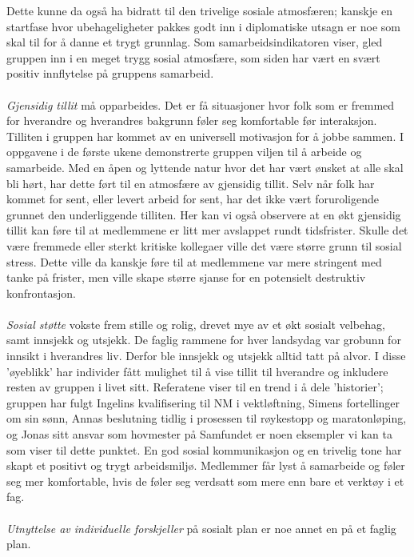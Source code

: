 Dette kunne da også ha bidratt til den trivelige sosiale atmosfæren; kanskje en startfase hvor ubehageligheter pakkes godt inn i diplomatiske utsagn er noe som skal til for å danne et trygt grunnlag.
Som samarbeidsindikatoren viser, gled gruppen inn i en meget trygg sosial atmosfære, som siden har vært en svært positiv innflytelse på gruppens samarbeid.\\
\\
\emph{Gjensidig tillit} må opparbeides. 
Det er få situasjoner hvor folk som er fremmed for hverandre og hverandres bakgrunn føler seg komfortable før interaksjon.
Tilliten i gruppen har kommet av en universell motivasjon for å jobbe sammen. 
I oppgavene i de første ukene demonstrerte gruppen viljen til å  arbeide og samarbeide.
Med en åpen og lyttende natur hvor det har vært ønsket at alle skal bli hørt, har dette ført til en atmosfære av gjensidig tillit. 
Selv når folk har kommet for sent, eller levert arbeid for sent, har det ikke vært foruroligende grunnet den underliggende tilliten.
Her kan vi også observere at en økt gjensidig tillit kan føre til at medlemmene er litt mer avslappet rundt tidsfrister.
Skulle det være fremmede eller sterkt kritiske kollegaer ville det være større grunn til sosial stress.
Dette ville da kanskje føre til at medlemmene var mere stringent med tanke på frister, men ville skape større sjanse for en potensielt destruktiv konfrontasjon.\\
\\
\emph{Sosial støtte} vokste frem stille og rolig, drevet mye av et økt sosialt velbehag, samt innsjekk og utsjekk. 
De faglig rammene for hver landsydag var grobunn for innsikt i hverandres liv. 
Derfor ble innsjekk og utsjekk alltid tatt på alvor. 
I disse 'øyeblikk' har individer fått mulighet til å vise tillit til hverandre og inkludere resten av gruppen i livet sitt. Referatene viser til en trend i å dele 'historier'; gruppen har fulgt Ingelins kvalifisering til NM i vektløftning, Simens fortellinger om sin sønn, Annas beslutning tidlig i prosessen til røykestopp og maratonløping, og Jonas sitt ansvar som hovmester på Samfundet er noen eksempler vi kan ta som viser til dette punktet.
En god sosial kommunikasjon og en trivelig tone har skapt et positivt og trygt arbeidsmiljø\cite{happy}.
Medlemmer får lyst å samarbeide og føler seg mer komfortable, hvis de føler seg verdsatt som mere enn bare et verktøy i et fag.\\
\\
\emph{Utnyttelse av individuelle forskjeller} på sosialt plan er noe annet en på et faglig plan.
